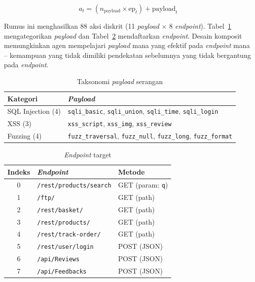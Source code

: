 \documentclass[a4paper,12pt]{article}
\begin{document}
\begin{equation}\label{eq:action}
a_t = (n_{\text{payload}} \times \text{ep}_t) + \text{payload}_t
\end{equation}

Rumus ini menghasilkan 88 aksi diskrit (11 \textit{payload} $\times$ 8 \textit{endpoint}). Tabel~\ref{tab:payloads} mengategorikan \textit{payload} dan Tabel~\ref{tab:endpoints} mendaftarkan \textit{endpoint}. Desain komposit memungkinkan agen mempelajari \textit{payload} mana yang efektif pada \textit{endpoint} mana -- kemampuan yang tidak dimiliki pendekatan sebelumnya yang tidak bergantung pada \textit{endpoint}.

\begin{table}[H]
\caption{ Taksonomi \textit{payload} serangan}
\centering
\label{tab:payloads}
\small
\begin{tabular}{ll}
\toprule
Kategori & \textit{Payload} \\
\midrule
SQL Injection (4) & \texttt{sqli\_basic}, \texttt{sqli\_union}, \texttt{sqli\_time}, \texttt{sqli\_login} \\
XSS (3) & \texttt{xss\_script}, \texttt{xss\_img}, \texttt{xss\_review} \\
Fuzzing (4) & \texttt{fuzz\_traversal}, \texttt{fuzz\_null}, \texttt{fuzz\_long}, \texttt{fuzz\_format} \\
\bottomrule
\end{tabular}
\end{table}

\begin{table}[H]
\caption{\textit{Endpoint} target}
\centering
\label{tab:endpoints}
\small
\begin{tabular}{cll}
\toprule
Indeks & \textit{Endpoint} & Metode \\
\midrule
0 & \texttt{/rest/products/search} & GET (param: \texttt{q}) \\
1 & \texttt{/ftp/} & GET (path) \\
2 & \texttt{/rest/basket/} & GET (path) \\
3 & \texttt{/rest/products/} & GET (path) \\
4 & \texttt{/rest/track-order/} & GET (path) \\
5 & \texttt{/rest/user/login} & POST (JSON) \\
6 & \texttt{/api/Reviews} & POST (JSON) \\
7 & \texttt{/api/Feedbacks} & POST (JSON) \\
\bottomrule
\end{tabular}
\end{table}
\end{document}
